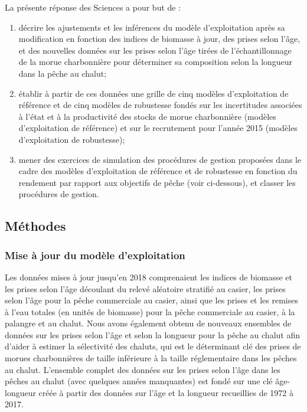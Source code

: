 \documentclass[11pt]{book}
\begin{document}
La présente réponse des Sciences a pour but de :
\begin{enumerate}
\def\labelenumi{\arabic{enumi}.}

\item
  décrire les ajustements et les inférences du modèle d'exploitation après sa modification en fonction des indices de biomasse à jour, des prises selon l'âge, et des nouvelles données sur les prises selon l'âge tirées de l'échantillonnage de la morue charbonnière pour déterminer sa composition selon la longueur dans la pêche au chalut;
\item
  établir à partir de ces données une grille de cinq modèles d'exploitation de référence et de cinq modèles de robustesse fondés sur les incertitudes associées à l'état et à la productivité des stocks de morue charbonnière (modèles d'exploitation de référence) et sur le recrutement pour l'année 2015 (modèles d'exploitation de robustesse);
\item
  mener des exercices de simulation des procédures de gestion proposées dans le cadre des modèles d'exploitation de référence et de robustesse en fonction du rendement par rapport aux objectifs de pêche (voir ci-dessous), et classer les procédures de gestion.
\end{enumerate}
\hypertarget{muxe9thodes}{%
\subsection{Méthodes}\label{muxe9thodes}}

\hypertarget{mise-uxe0-jour-du-moduxe8le-dexploitation}{%
\subsubsection{Mise à jour du modèle d'exploitation}\label{mise-uxe0-jour-du-moduxe8le-dexploitation}}

Les données mises à jour jusqu'en 2018 comprenaient les indices de biomasse et les prises selon l'âge découlant du relevé aléatoire stratifié au casier, les prises selon l'âge pour la pêche commerciale au casier, ainsi que les prises et les remises à l'eau totales (en unités de biomasse) pour la pêche commerciale au casier, à la palangre et au chalut. Nous avons également obtenu de nouveaux ensembles de données sur les prises selon l'âge et selon la longueur pour la pêche au chalut afin d'aider à estimer la sélectivité des chaluts, qui est le déterminant clé des prises de morues charbonnières de taille inférieure à la taille réglementaire dans les pêches au chalut. L'ensemble complet des données sur les prises selon l'âge dans les pêches au chalut (avec quelques années manquantes) est fondé sur une clé âge-longueur créée à partir des données sur l'âge et la longueur recueillies de 1972 à 2017.
\end{document}
